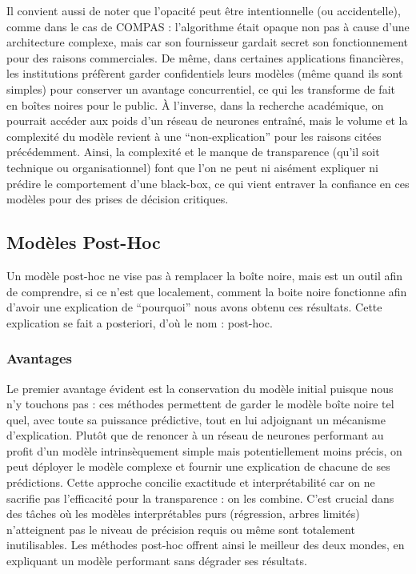 \documentclass{article}
\begin{document}
Il convient aussi de noter que l’opacité peut être intentionnelle (ou accidentelle), comme dans le cas de COMPAS : l’algorithme était opaque non pas à cause d’une architecture complexe, mais car son fournisseur gardait secret son fonctionnement pour des raisons commerciales. De même, dans certaines applications financières, les institutions préfèrent garder confidentiels leurs modèles (même quand ils sont simples) pour conserver un avantage concurrentiel, ce qui les transforme de fait en boîtes noires pour le public. À l’inverse, dans la recherche académique, on pourrait accéder aux poids d’un réseau de neurones entraîné, mais le volume et la complexité du modèle revient à une “non-explication” pour les raisons citées précédemment. Ainsi, la complexité et le manque de transparence (qu’il soit technique ou organisationnel) font que l’on ne peut ni aisément expliquer ni prédire le comportement d’une black-box, ce qui vient entraver la confiance en ces modèles pour des prises de décision critiques.

\subsection{Modèles Post-Hoc}

\quad Un modèle post-hoc ne vise pas à remplacer la boîte noire, mais est un outil afin de comprendre, si ce n’est que localement, comment la boite noire fonctionne afin d’avoir une explication de “pourquoi” nous avons obtenu ces résultats. Cette explication se fait a posteriori, d'où le nom : post-hoc.

    \subsubsection{Avantages}
    
    \quad Le premier avantage évident est la conservation du modèle initial puisque nous n’y touchons pas : ces méthodes permettent de garder le modèle boîte noire tel quel, avec toute sa puissance prédictive, tout en lui adjoignant un mécanisme d’explication. Plutôt que de renoncer à un réseau de neurones performant au profit d’un modèle intrinsèquement simple mais potentiellement moins précis, on peut déployer le modèle complexe et fournir une explication de chacune de ses prédictions. Cette approche concilie exactitude et interprétabilité car on ne sacrifie pas l’efficacité pour la transparence : on les combine. C’est crucial dans des tâches où les modèles interprétables purs (régression, arbres limités) n’atteignent pas le niveau de précision requis ou même sont totalement inutilisables. Les méthodes post-hoc offrent ainsi le meilleur des deux mondes, en expliquant un modèle performant sans dégrader ses résultats.\\
    
\end{document}
